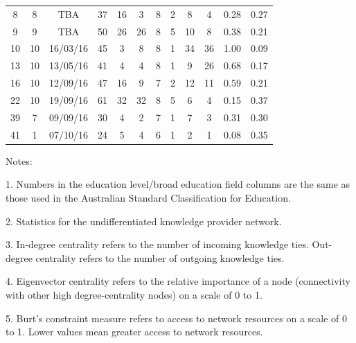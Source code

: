 \begin{landscape}
\begin{table}[]
\begin{threeparttable}
\begin{tabular}{@{}cccccccccccc@{}}
				8    & 8  &   TBA     & 37  & 16                  & 3            & 8       & 2               & 8         & 4          & 0.28                    & 0.27       \\
				9    & 9  &   TBA     & 50  & 26                  & 26           & 8       & 5               & 10        & 8          & 0.38                    & 0.21       \\
				10   & 10 &  16/03/16       & 45  & 3                   & 8            & 8       & 1               & 34        & 36         & 1.00                    & 0.09       \\
				13   & 10 &  13/05/16      & 41  & 4                   & 4            & 8       & 1               & 9         & 26         & 0.68                    & 0.17       \\
				16   & 10 &  12/09/16      & 47  & 16                  & 9            & 7       & 2               & 12        & 11         & 0.59                    & 0.21       \\
				22   & 10 &  19/09/16      & 61  & 32                  & 32           & 8       & 5               & 6         & 4          & 0.15                    & 0.37       \\
				39   & 7  &  09/09/16      & 30  & 4                   & 2            & 7       & 1               & 7         & 3          & 0.31                    & 0.30       \\
				41   & 1  &  07/10/16      & 24  & 5                   & 4            & 6       & 1               & 2         & 1          & 0.08                    & 0.35       \\ \bottomrule
			\end{tabular}
			\begin{tablenotes}
				\small
				\item Notes:
				\item 1. Numbers in the education level/broad education field columns are the same as those used in the Australian Standard Classification for Education.
				\item 2. Statistics for the undifferentiated knowledge provider network.
				\item 3. In-degree centrality refers to the number of incoming knowledge ties. Out-degree centrality refers to the number of outgoing knowledge ties.
				\item 4. Eigenvector centrality refers to the relative importance of a node (connectivity with other high degree-centrality nodes) on a scale of 0 to 1.
				\item 5. Burt's constraint measure refers to access to network resources on a scale of 0 to 1. Lower values mean greater access to network resources.
			\end{tablenotes}
		\end{threeparttable}
	\end{table}
\end{landscape}

